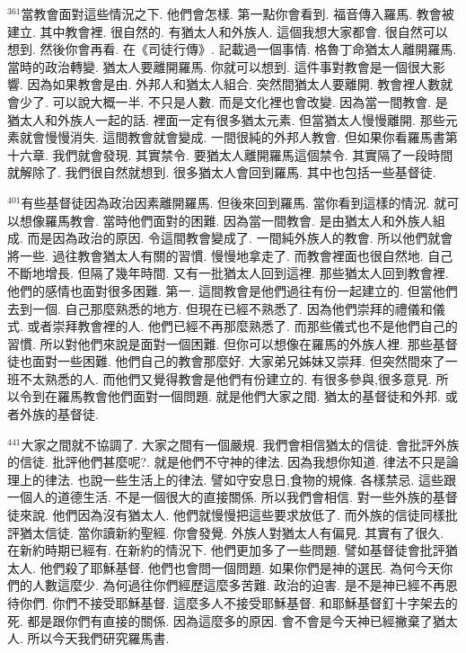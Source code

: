 \documentclass{book}
\begin{document}
$^{361}$當教會面對這些情況之下.
他們會怎樣.
第一點你會看到.
福音傳入羅馬.
教會被建立.
其中教會裡.
很自然的.
有猶太人和外族人.
這個我想大家都會.
很自然可以想到.
然後你會再看.
在《司徒行傳》.
記載過一個事情.
格魯丁命猶太人離開羅馬.
當時的政治轉變.
猶太人要離開羅馬.
你就可以想到.
這件事對教會是一個很大影響.
因為如果教會是由.
外邦人和猶太人組合.
突然間猶太人要離開.
教會裡人數就會少了.
可以說大概一半.
不只是人數.
而是文化裡也會改變.
因為當一間教會.
是猶太人和外族人一起的話.
裡面一定有很多猶太元素.
但當猶太人慢慢離開.
那些元素就會慢慢消失.
這間教會就會變成.
一間很純的外邦人教會.
但如果你看羅馬書第十六章.
我們就會發現.
其實禁令.
要猶太人離開羅馬這個禁令.
其實隔了一段時間就解除了.
我們很自然就想到.
很多猶太人會回到羅馬.
其中也包括一些基督徒.

$^{401}$有些基督徒因為政治因素離開羅馬.
但後來回到羅馬.
當你看到這樣的情況.
就可以想像羅馬教會.
當時他們面對的困難.
因為當一間教會.
是由猶太人和外族人組成.
而是因為政治的原因.
令這間教會變成了.
一間純外族人的教會.
所以他們就會將一些.
過往教會猶太人有關的習慣.
慢慢地拿走了.
而教會裡面也很自然地.
自己不斷地增長.
但隔了幾年時間.
又有一批猶太人回到這裡.
那些猶太人回到教會裡.
他們的感情也面對很多困難.
第一.
這間教會是他們過往有份一起建立的.
但當他們去到一個.
自己那麼熟悉的地方.
但現在已經不熟悉了.
因為他們崇拜的禮儀和儀式.
或者崇拜教會裡的人.
他們已經不再那麼熟悉了.
而那些儀式也不是他們自己的習慣.
所以對他們來說是面對一個困難.
但你可以想像在羅馬的外族人裡.
那些基督徒也面對一些困難.
他們自己的教會那麼好.
大家弟兄姊妹又崇拜.
但突然間來了一班不太熟悉的人.
而他們又覺得教會是他們有份建立的.
有很多參與,很多意見.
所以令到在羅馬教會他們面對一個問題.
就是他們大家之間.
猶太的基督徒和外邦.
或者外族的基督徒.

$^{441}$大家之間就不協調了.
大家之間有一個嚴規.
我們會相信猶太的信徒.
會批評外族的信徒.
批評他們甚麼呢?.
就是他們不守神的律法.
因為我想你知道.
律法不只是論理上的律法.
也說一些生活上的律法.
譬如守安息日,食物的規條.
各樣禁忌.
這些跟一個人的道德生活.
不是一個很大的直接關係.
所以我們會相信.
對一些外族的基督徒來說.
他們因為沒有猶太人.
他們就慢慢把這些要求放低了.
而外族的信徒同樣批評猶太信徒.
當你讀新約聖經.
你會發覺.
外族人對猶太人有偏見.
其實有了很久.
在新約時期已經有.
在新約的情況下.
他們更加多了一些問題.
譬如基督徒會批評猶太人.
他們殺了耶穌基督.
他們也會問一個問題.
如果你們是神的選民.
為何今天你們的人數這麼少.
為何過往你們經歷這麼多苦難.
政治的迫害.
是不是神已經不再恩待你們.
你們不接受耶穌基督.
這麼多人不接受耶穌基督.
和耶穌基督釘十字架去的死.
都是跟你們有直接的關係.
因為這麼多的原因.
會不會是今天神已經撇棄了猶太人.
所以今天我們研究羅馬書.
\end{document}
